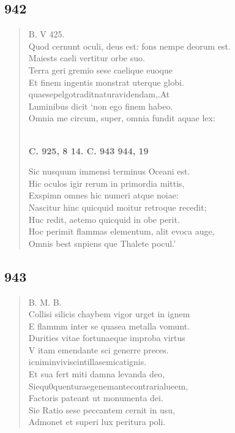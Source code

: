 \documentclass[11pt, a4paper]{report}
\begin{document}
            \subsection*{942}
      \begin{verse}
      B. V 425. \\ Quod cernunt oculi, deus est: fons nempe deorum est. \\ Maiests caeli vertitur orbe suo. \\ Terra geri gremio sese caelique euoque \\ Et finem ingentis monstrat uterque globi. \\ quaesepelgotraditnaturavidendam,.At \\ Luminibus dicit ‘non ego finem habeo. \\ Omnia me circum, super, omnia fundit aquae lex: \\ 
        ﻿\pagebreak 
     \marginpar{[365]} \begin{center} \textbf{C. 925, 8 14. C. 943 944, 19} \end{center}Sic nusquum immensi terminus Oceani est. \\ Hic oculos igir rerum in primordia mittis, \\ Exspimn omnes hic numeri atque noiae: \\ Nascitur hinc quicquid moitur retroque recedit; \\ Huc redit, aetemo quicquid in obe perit. \\ Hoc perimit flammas elementum, alit evoca auge, \\ Omnis best snpiens que Thalete pocul.’ \\ 
      \end{verse}
  
            \subsection*{943}
      \begin{verse}
      B. M. B. \\ Collisi silicis chaybem vigor urget in ignem \\ E flammm inter se quasea metalla vomunt. \\ Durities vitae fortunaeque improba virtus \\ V itam emendante sci generre preces. \\ icniminviviscintillasemicatignis. \\ Et sua fert miti damna levanda deo, \\ Siequ0quenturaegenemantecontrarialueem, \\ Factoris pateant ut monumenta dei. \\ Sie Ratio sese peccantem cernit in usu, \\ Admonet et superi lux peritura poli. \\ 
      \end{verse}
  
\end{document}
